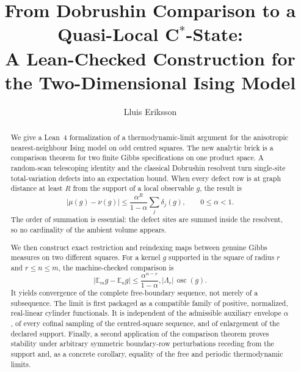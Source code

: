 \documentclass[11pt]{article}
\title{From Dobrushin Comparison to a Quasi-Local C$^*$-State:\\
A Lean-Checked Construction for the Two-Dimensional Ising Model}
\author{Lluis Eriksson}
\date{}
\theoremstyle{definition}
\newcommand{\E}{\mathbb E}
\newcommand{\osc}{\operatorname{osc}}
\newcommand{\abs}[1]{\lvert #1\rvert}
\begin{document}
\maketitle

\begin{abstract}
We give a Lean~4 formalization of a thermodynamic-limit argument for the
anisotropic nearest-neighbour Ising model on odd centred squares.  The new
analytic brick is a comparison theorem for two finite Gibbs specifications on
one product space.  A random-scan telescoping identity and the classical
Dobrushin resolvent turn single-site total-variation defects into an
expectation bound.  When every defect row is at graph distance at least $R$
from the support of a local observable $g$, the result is
\[
  \abs{\mu(g)-\nu(g)}
  \le \frac{\alpha^R}{1-\alpha}\sum_j\delta_j(g),
  \qquad 0\le\alpha<1.
\]
The order of summation is essential: the defect sites are summed inside the
resolvent, so no cardinality of the ambient volume appears.

We then construct exact restriction and reindexing maps between genuine Gibbs
measures on two different squares.  For a kernel $g$ supported in the square
of radius $r$ and $r\le n\le m$, the machine-checked comparison is
\[
  \abs{\E_m g-\E_n g}
  \le
  \frac{\alpha^{n-r}}{1-\alpha},
  \abs{\Lambda_r}\,\osc(g).
\]
It yields convergence of the complete free-boundary sequence, not merely of a
subsequence.  The limit is first packaged as a compatible family of positive,
normalized, real-linear cylinder functionals.  It is independent of the
admissible auxiliary envelope $\alpha$, of every cofinal sampling of the
centred-square sequence, and of enlargement of the declared support.
Finally, a second application of the comparison theorem proves stability under
arbitrary symmetric boundary-row perturbations receding from the support and,
as a concrete corollary, equality of the free and periodic thermodynamic
limits.


\end{abstract}
\end{document}
